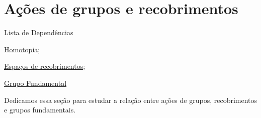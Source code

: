 \section{Ações de grupos e recobrimentos}
\label{ações-de-grupos-e-recobrimentos}

\begin{titlemize}{Lista de Dependências}
	\item \hyperref[homotopia]{Homotopia}; %
	\item \hyperref[espaco-de-recobrimento]{Espaços de recobrimentos};
    \item\hyperref[grupo-fundamental]{Grupo Fundamental}
\end{titlemize}

Dedicamos essa seção para estudar a relação entre ações de grupos, recobrimentos e grupos fundamentais. 







